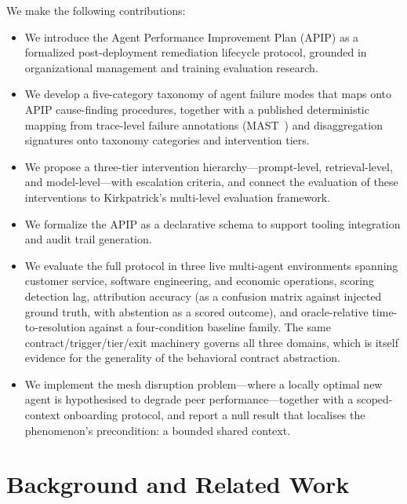 \documentclass[conference]{IEEEtran}
\begin{document}
We make the following contributions:
\begin{itemize}
  \item We introduce the Agent Performance Improvement Plan (APIP) as a
        formalized post-deployment remediation lifecycle protocol, grounded in
        organizational management and training evaluation research.
  \item We develop a five-category taxonomy of agent failure modes that maps
        onto APIP cause-finding procedures, together with a published
        deterministic mapping from trace-level failure annotations
        (MAST~\cite{cemri2025mast}) and disaggregation signatures onto taxonomy
        categories and intervention tiers.
  \item We propose a three-tier intervention hierarchy---prompt-level,
        retrieval-level, and model-level---with escalation criteria, and connect
        the evaluation of these interventions to Kirkpatrick's multi-level
        evaluation framework.
  \item We formalize the APIP as a declarative schema to support tooling
        integration and audit trail generation.
  \item We evaluate the full protocol in three live multi-agent environments
        spanning customer service, software engineering, and economic
        operations, scoring detection lag, attribution accuracy (as a confusion
        matrix against injected ground truth, with abstention as a scored
        outcome), and oracle-relative time-to-resolution against a four-condition
        baseline family. The same contract/trigger/tier/exit machinery governs
        all three domains, which is itself evidence for the generality of the
        behavioral contract abstraction.
  \item We implement the mesh disruption problem---where a locally optimal new
        agent is hypothesised to degrade peer performance---together with a
        scoped-context onboarding protocol, and report a null result that
        localises the phenomenon's precondition: a bounded shared context.
\end{itemize}
\section{Background and Related Work}
\label{sec:background}
\end{document}
